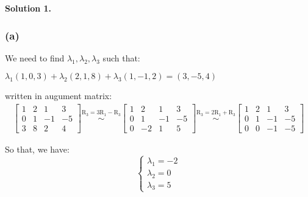 \documentclass[12pt]{article}
\newcommand{\solution}[1]{\noindent \textbf{Solution #1.}}
\begin{document}
\solution{1}

\subsubsection*{(a)}

  We need to find $\lambda_1, \lambda_2, \lambda_3$ such that:
  \begin{center}
    $\lambda_1(1,0,3)+\lambda_2(2,1,8)+\lambda_3(1,-1,2)=(3,-5,4)$
  \end{center}
  written in augument matrix:
  \[
  \begin{aligned}
  \left[\begin{array}{ccc|c}
  1 & 2 & 1 & 3 \\
  0 & 1 & -1 & -5 \\ 
  3 & 8 & 2 & 4
  \end{array}\right]
  \overset{\text{R}_3 = 3\text{R}_1 - \text{R}_3}{\sim}
  \left[\begin{array}{ccc|c}
  1 & 2 & 1 & 3 \\
  0 & 1 & -1 & -5 \\
  0 & -2 & 1 & 5
  \end{array}\right]
  \overset{\text{R}_3 = 2\text{R}_1 + \text{R}_3}{\sim}
  \left[\begin{array}{ccc|c}
  1 & 2 & 1 & 3 \\
  0 & 1 & -1 & -5 \\
  0 & 0 & -1 & -5
  \end{array}\right]
  \end{aligned}
  \]


  So that, we have:
  $$
  \left\{\begin{array}{l}
  \lambda_1=-2 \\
  \lambda_2=0 \\
  \lambda_3=5
  \end{array}\right.
  $$
\end{document}
